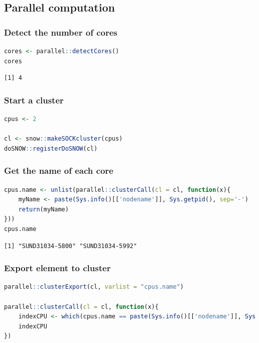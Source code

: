 \documentclass{article}
\begin{document}
\subsection{Parallel computation}
\label{sec:orgffb2981}
\subsubsection{Detect the number of cores}
\label{sec:orgd0b38c1}

\begin{lstlisting}[language=r,numbers=none]
cores <- parallel::detectCores()
cores
\end{lstlisting}

\label{}
\begin{verbatim}
[1] 4
\end{verbatim}
\subsubsection{Start a cluster}
\label{sec:orgb956db2}
\begin{lstlisting}[language=r,numbers=none]
cpus <- 2

cl <- snow::makeSOCKcluster(cpus)
doSNOW::registerDoSNOW(cl)
\end{lstlisting}
\subsubsection{Get the name of each core}
\label{sec:org6b172ff}

\begin{lstlisting}[language=r,numbers=none]
cpus.name <- unlist(parallel::clusterCall(cl = cl, function(x){
    myName <- paste(Sys.info()[['nodename']], Sys.getpid(), sep='-')
    return(myName)
}))
cpus.name
\end{lstlisting}

\label{}
\begin{verbatim}
[1] "SUND31034-5800" "SUND31034-5992"
\end{verbatim}
\subsubsection{Export element to cluster}
\label{sec:orge1a6d94}
\begin{lstlisting}[language=r,numbers=none]
parallel::clusterExport(cl, varlist = "cpus.name")

parallel::clusterCall(cl = cl, function(x){
    indexCPU <- which(cpus.name == paste(Sys.info()[['nodename']], Sys.getpid(), sep='-'))
    indexCPU
})
\end{lstlisting}
\end{document}

